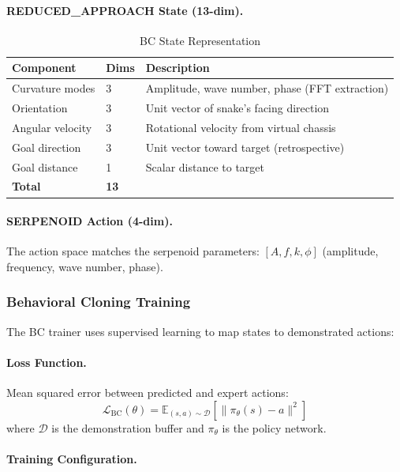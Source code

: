 \documentclass[11pt]{article}
\begin{document}
\paragraph{REDUCED\_APPROACH State (13-dim).}
\begin{table}[H]
\centering
\caption{BC State Representation}
\begin{tabular}{@{}lll@{}}
\toprule
\textbf{Component} & \textbf{Dims} & \textbf{Description} \\
\midrule
Curvature modes & 3 & Amplitude, wave number, phase (FFT extraction) \\
Orientation & 3 & Unit vector of snake's facing direction \\
Angular velocity & 3 & Rotational velocity from virtual chassis \\
Goal direction & 3 & Unit vector toward target (retrospective) \\
Goal distance & 1 & Scalar distance to target \\
\midrule
\textbf{Total} & \textbf{13} & \\
\bottomrule
\end{tabular}
\end{table}

\paragraph{SERPENOID Action (4-dim).}
The action space matches the serpenoid parameters: $[A, f, k, \phi]$ (amplitude, frequency, wave number, phase).

\subsubsection{Behavioral Cloning Training}

The BC trainer uses supervised learning to map states to demonstrated actions:

\paragraph{Loss Function.}
Mean squared error between predicted and expert actions:
\begin{equation}
    \mathcal{L}_{\text{BC}}(\theta) = \mathbb{E}_{(s, a) \sim \mathcal{D}} \left[ \|\pi_\theta(s) - a\|^2 \right]
\end{equation}
where $\mathcal{D}$ is the demonstration buffer and $\pi_\theta$ is the policy network.

\paragraph{Training Configuration.}
\end{document}
